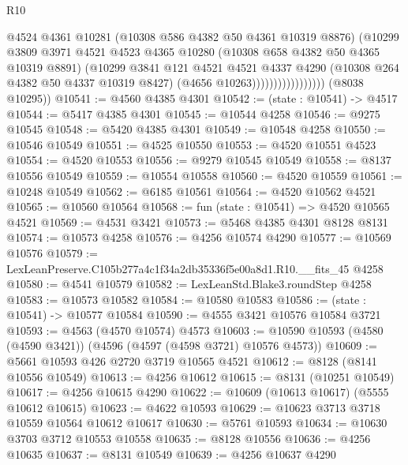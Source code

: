 \begin{lexlean}{R10}
\begin{coremodule}
                                  @4524
                                  @4361
                                  @10281
                                  (@10308 @586 @4382 @50 @4361 @10319 @8876)
                                  (@10299
                                    @3809
                                    @3971
                                    @4521
                                    @4523
                                    @4365
                                    @10280
                                    (@10308 @658 @4382 @50 @4365 @10319 @8891)
                                    (@10299
                                      @3841
                                      @121
                                      @4521
                                      @4521
                                      @4337
                                      @4290
                                      (@10308 @264 @4382 @50 @4337 @10319 @8427)
                                      (@4656 @10263)))))))))))))))))
      (@8038 @10295))
@10541 := @4560 @4385 @4301
@10542 := (state : @10541) -> @4517
@10544 := @5417 @4385 @4301
@10545 := @10544 @4258
@10546 := @9275 @10545
@10548 := @5420 @4385 @4301
@10549 := @10548 @4258
@10550 := @10546 @10549
@10551 := @4525 @10550
@10553 := @4520 @10551 @4523
@10554 := @4520 @10553
@10556 := @9279 @10545 @10549
@10558 := @8137 @10556 @10549
@10559 := @10554 @10558
@10560 := @4520 @10559
@10561 := @10248 @10549
@10562 := @6185 @10561
@10564 := @4520 @10562 @4521
@10565 := @10560 @10564
@10568 := fun (state : @10541) => @4520 @10565 @4521
@10569 := @4531 @3421
@10573 := @5468 @4385 @4301 @8128 @8131
@10574 := @10573 @4258
@10576 := @4256 @10574 @4290
@10577 := @10569 @10576
@10579 := LexLeanPreserve.C105b277a4c1f34a2db35336f5e00a8d1.R10.__fits_45 @4258
@10580 := @4541 @10579
@10582 := LexLeanStd.Blake3.roundStep @4258
@10583 := @10573 @10582
@10584 := @10580 @10583
@10586 := (state : @10541) -> @10577 @10584
@10590 := @4555 @3421 @10576 @10584 @3721
@10593 := @4563 (@4570 @10574) @4573
@10603 := @10590 @10593 (@4580 (@4590 @3421)) (@4596 (@4597 (@4598 @3721) @10576 @4573))
@10609 := @5661 @10593 @426 @2720 @3719 @10565 @4521
@10612 := @8128 (@8141 @10556 @10549)
@10613 := @4256 @10612
@10615 := @8131 (@10251 @10549)
@10617 := @4256 @10615 @4290
@10622 := @10609 (@10613 @10617) (@5555 @10612 @10615)
@10623 := @4622 @10593
@10629 := @10623 @3713 @3718 @10559 @10564 @10612 @10617
@10630 := @5761 @10593
@10634 := @10630 @3703 @3712 @10553 @10558
@10635 := @8128 @10556
@10636 := @4256 @10635
@10637 := @8131 @10549
@10639 := @4256 @10637 @4290

\end{coremodule}
\end{lexlean}
